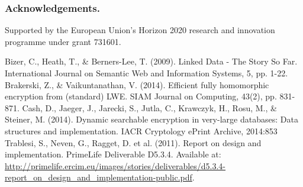 \documentclass[runningheads,a4paper]{llncs}
\begin{document}
\subsubsection*{Acknowledgements.}Supported by the European Union's Horizon 2020 research and innovation programme under grant 731601.


\begin{thebibliography}{4}

 Bizer, C., Heath, T., \& Berners-Lee, T. (2009). Linked Data - The Story So Far. International Journal
 on Semantic Web and Information Systems, 5, pp. 1-22.
 Brakerski, Z., \& Vaikuntanathan, V. (2014). Efficient fully homomorphic encryption from (standard)
 LWE. SIAM Journal on Computing, 43(2), pp. 831-871.
 Cash, D., Jaeger, J., Jarecki, S., Jutla, C., Krawczyk, H., Rosu, M., \& Steiner, M. (2014). Dynamic
 searchable encryption in very-large databases: Data structures and implementation. IACR Cryptology ePrint
 Archive, 2014:853
 Trablesi, S., Neven, G., Ragget, D. et al. (2011). Report on design and implementation. PrimeLife
 Deliverable D5.3.4. Available at:
 \url{http://primelife.ercim.eu/images/stories/deliverables/d5.3.4-report\_on\_design\_and\_implementation-public.pdf}. 

\end{thebibliography}
\end{document}
